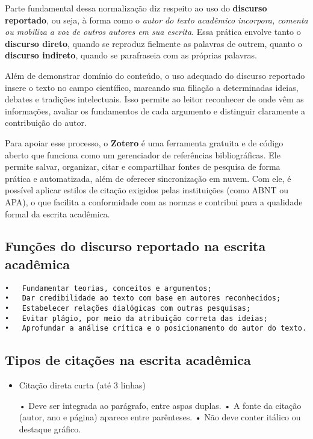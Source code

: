 \documentclass[
  letterpaper,
  DIV=11,
  numbers=noendperiod]{scrreprt}
\begin{document}
Parte fundamental dessa normalização diz respeito ao uso do
\textbf{discurso reportado}, ou seja, à forma como o \emph{autor do
texto acadêmico incorpora, comenta ou mobiliza a voz de outros autores
em sua escrita}. Essa prática envolve tanto o \textbf{discurso direto},
quando se reproduz fielmente as palavras de outrem, quanto o
\textbf{discurso indireto}, quando se parafraseia com as próprias
palavras.

Além de demonstrar domínio do conteúdo, o uso adequado do discurso
reportado insere o texto no campo científico, marcando sua filiação a
determinadas ideias, debates e tradições intelectuais. Isso permite ao
leitor reconhecer de onde vêm as informações, avaliar os fundamentos de
cada argumento e distinguir claramente a contribuição do autor.

Para apoiar esse processo, o \textbf{Zotero} é uma ferramenta gratuita e
de código aberto que funciona como um gerenciador de referências
bibliográficas. Ele permite salvar, organizar, citar e compartilhar
fontes de pesquisa de forma prática e automatizada, além de oferecer
sincronização em nuvem. Com ele, é possível aplicar estilos de citação
exigidos pelas instituições (como ABNT ou APA), o que facilita a
conformidade com as normas e contribui para a qualidade formal da
escrita acadêmica.

\subsection{Funções do discurso reportado na escrita
acadêmica}\label{funuxe7uxf5es-do-discurso-reportado-na-escrita-acaduxeamica}

\begin{verbatim}
•   Fundamentar teorias, conceitos e argumentos;
•   Dar credibilidade ao texto com base em autores reconhecidos;
•   Estabelecer relações dialógicas com outras pesquisas;
•   Evitar plágio, por meio da atribuição correta das ideias;
•   Aprofundar a análise crítica e o posicionamento do autor do texto.
\end{verbatim}

\subsection{Tipos de citações na escrita
acadêmica}\label{tipos-de-citauxe7uxf5es-na-escrita-acaduxeamica}

\begin{itemize}
\item
  Citação direta curta (até 3 linhas)

  • Deve ser integrada ao parágrafo, entre aspas duplas. • A fonte da
  citação (autor, ano e página) aparece entre parênteses. • Não deve
  conter itálico ou destaque gráfico.
\end{itemize}
\end{document}

